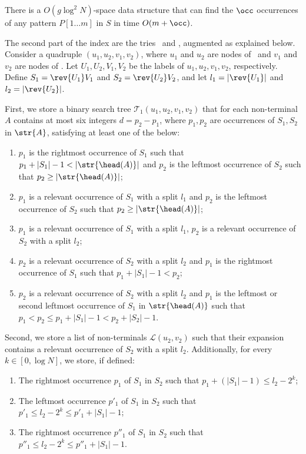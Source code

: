 \begin{fact}
There is a $O(g \log^2 N)$-space data structure that can find the $\occ$ occurrences of any pattern $P[1\dots m]$ in $S$ in time $O(m + \occ)$.
\end{fact}

The second part of the index are the tries \Tpre\ and \Tsuf, augmented as explained below. Consider a quadruple $(u_1,u_2,v_1,v_2)$, where $u_1$ and $u_2$ are nodes of \Tpre\ and $v_1$ and $v_2$ are nodes of \Tsuf. Let $U_1, U_2, V_1, V_2$ be the labels of $u_1, u_2, v_1, v_2$, respectively. Define $S_1=\rev{U_1}V_1$ and $S_2=\rev{U_2}V_2$, and let $l_1 = |\rev{U_1}|$ and $l_2 = |\rev{U_2}|$.  

First, we store a binary search tree $\mathcal{T}_1(u_1, u_2, v_1, v_2)$ that for each non-terminal $A$ contains at most six integers $d = p_2-p_1$, where $p_1, p_2$ are occurrences of $S_1,S_2$ in $\str{A}$, satisfying at least one of the below:
\begin{enumerate}
\item $p_1$ is the rightmost occurrence of $S_1$ such that $p_1+|S_1|-1 < |\str{\head(A)}|$ and $p_2$ is the leftmost occurrence of $S_2$ such that $p_2 \ge |\str{\head(A)}|$;
\item $p_1$ is a relevant occurrence of $S_1$ with a split $l_1$ and $p_2$ is the leftmost occurrence of $S_2$ such that $p_2 \ge |\str{\head(A)}|$;
\item $p_1$ is a relevant occurrence of $S_1$ with a split $l_1$, $p_2$ is a relevant occurrence of $S_2$ with a split $l_2$; 
\item $p_2$ is a relevant occurrence of $S_2$ with a split $l_2$ and $p_1$ is the rightmost occurrence of $S_1$ such that $p_1+|S_1|-1<p_2$;
\item $p_2$ is a relevant occurrence of $S_2$ with a split $l_2$ and $p_1$ is the leftmost or second leftmost occurrence of $S_1$ in $\str{\head(A)}$ 
such that $p_1 < p_2 \le p_1+|S_1|-1 < p_2+|S_2|-1$. 
\end{enumerate}

Second, we store a list of non-terminals $\mathcal{L}(u_2, v_2)$ such that their expansion contains a relevant occurrence of $S_2$ with a split $l_2$. Additionally, for every $k \in [0, \log N]$, we store, if defined:
\begin{enumerate}
\item The rightmost occurrence $p_1$ of $S_1$ in $S_2$ such that $p_1+(|S_1|-1) \le l_2-2^k$;
\item The leftmost occurrence $p'_1$ of $S_1$ in $S_2$ such that $p'_1 \le l_2-2^k \le p'_1+|S_1|-1$;
\item The rightmost occurrence $p''_1$ of $S_1$ in $S_2$ such that $p''_1 \le l_2-2^k \le p''_1+|S_1|-1$.
\end{enumerate}

